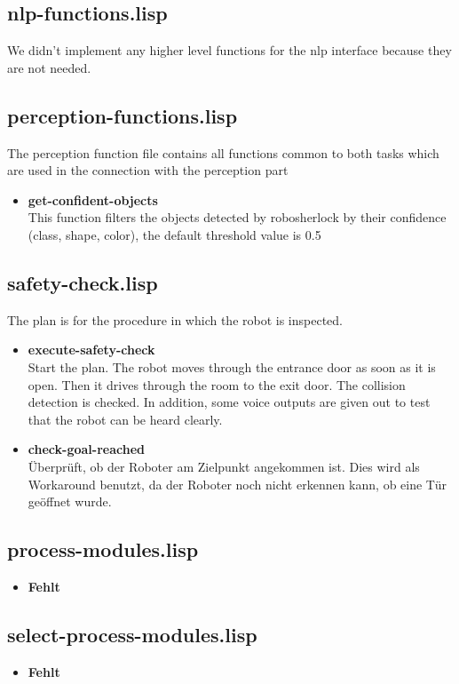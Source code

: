 \documentclass[main.tex]{subfiles}
\begin{document}
	    \subsection{nlp-functions.lisp}
	     We didn't implement any higher level functions for the nlp interface because they are not needed.
	    \subsection{perception-functions.lisp}
	    The perception function file contains all functions common to both tasks which are used in the connection with the perception part
	    \begin{itemize}
	    	\item \textbf{get-confident-objects} \\
	    	This function filters the objects detected by robosherlock by their confidence (class, shape, color), the default threshold value is 0.5
	    \end{itemize}
	    \subsection{safety-check.lisp}
	    The plan is for the procedure in which the robot is inspected. 
	    \begin{itemize}
	    	\item \textbf{execute-safety-check} \\
	    	Start the plan. The robot moves through the entrance door as soon as it is open. Then it drives through the room to the exit door. The collision detection is checked. In addition, some voice outputs are given out to test that the robot can be heard clearly.
	    	\item \textbf{check-goal-reached}\\
	    	Überprüft, ob der Roboter am Zielpunkt angekommen ist. Dies wird als Workaround benutzt, da der Roboter noch nicht erkennen kann, ob eine Tür geöffnet wurde.
	    \end{itemize}
	    \subsection{process-modules.lisp}
	    \begin{itemize}
	    	\item \textbf{Fehlt} \\
	    \end{itemize}
	    \subsection{select-process-modules.lisp}
	    \begin{itemize}
	    	\item \textbf{Fehlt} \\
	    \end{itemize}
\end{document}
